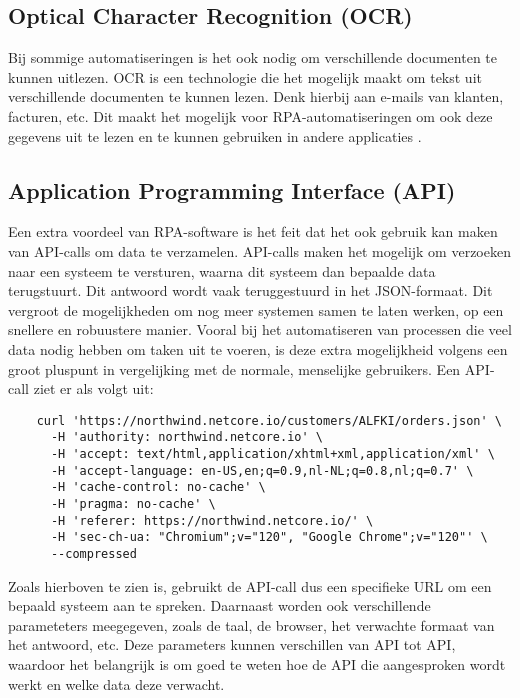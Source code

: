 \subsection{Optical Character Recognition (OCR)}
\label{subsec:ocr}

Bij sommige automatiseringen is het ook nodig om verschillende documenten te kunnen uitlezen. OCR is een technologie die het mogelijk maakt om tekst uit verschillende documenten te kunnen lezen. Denk hierbij aan e-mails van klanten, facturen, etc. Dit maakt het mogelijk voor RPA-automatiseringen om ook deze gegevens uit te lezen en te kunnen gebruiken in andere applicaties \autocite{ZalewskaTurzynska2022}.

\subsection{Application Programming Interface (API)}
\label{subsec:api}

Een extra voordeel van RPA-software is het feit dat het ook gebruik kan maken van API-calls om data te verzamelen. API-calls maken het mogelijk om verzoeken naar een systeem te versturen, waarna dit systeem dan bepaalde data terugstuurt. Dit antwoord wordt vaak teruggestuurd in het JSON-formaat. Dit vergroot de mogelijkheden om nog meer systemen samen te laten werken, op een snellere en robuustere manier. Vooral bij het automatiseren van processen die veel data nodig hebben om taken uit te voeren, is deze extra mogelijkheid volgens \textcite{Hofmann2020} een groot pluspunt in vergelijking met de normale, menselijke gebruikers.
Een API-call ziet er als volgt uit:
\begin{verbatim}
    curl 'https://northwind.netcore.io/customers/ALFKI/orders.json' \
      -H 'authority: northwind.netcore.io' \
      -H 'accept: text/html,application/xhtml+xml,application/xml' \
      -H 'accept-language: en-US,en;q=0.9,nl-NL;q=0.8,nl;q=0.7' \
      -H 'cache-control: no-cache' \
      -H 'pragma: no-cache' \
      -H 'referer: https://northwind.netcore.io/' \
      -H 'sec-ch-ua: "Chromium";v="120", "Google Chrome";v="120"' \
      --compressed
\end{verbatim}
Zoals hierboven te zien is, gebruikt de API-call dus een specifieke URL om een bepaald systeem aan te spreken. Daarnaast worden ook verschillende parameteters meegegeven, zoals de taal, de browser, het verwachte formaat van het antwoord, etc. Deze parameters kunnen verschillen van API tot API, waardoor het belangrijk is om goed te weten hoe de API die aangesproken wordt werkt en welke data deze verwacht.

